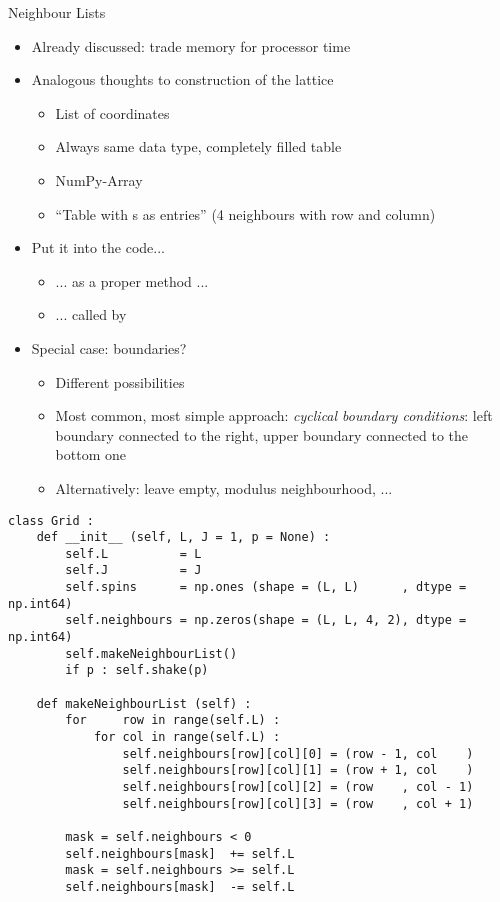 \begin{frame}[fragile]{Neighbour Lists}
%
\begin{itemize}
\item Already discussed: trade memory for processor time
\item Analogous thoughts to construction of the lattice
	\begin{itemize}
	\item List of coordinates
	\item Always same data type, completely filled table
	\item[\Thus] NumPy-Array
	\item \enquote{Table with s as entries} (4 neighbours with row and column)
	\end{itemize}
\item Put it into the code...
	\begin{itemize}
	\item ... as a proper method ...
	\item ... called by 
	\end{itemize}
\item Special case: boundaries?
	\begin{itemize}
	\item Different possibilities
	\item Most common, most simple approach: \emph{cyclical boundary conditions}: left boundary connected to the right, upper boundary connected to the bottom one
	\item Alternatively: leave empty, modulus neighbourhood, ...
	\end{itemize}
\end{itemize}
%
\end{frame}


\begin{frame}[fragile]
%
\vspace{-9pt}
\begin{codebox}
\begin{verbatim}
class Grid :
    def __init__ (self, L, J = 1, p = None) :
        self.L          = L
        self.J          = J
        self.spins      = np.ones (shape = (L, L)      , dtype = np.int64)
        self.neighbours = np.zeros(shape = (L, L, 4, 2), dtype = np.int64)
        self.makeNeighbourList()
        if p : self.shake(p)
    
    def makeNeighbourList (self) :
        for     row in range(self.L) :
            for col in range(self.L) :
                self.neighbours[row][col][0] = (row - 1, col    )
                self.neighbours[row][col][1] = (row + 1, col    )
                self.neighbours[row][col][2] = (row    , col - 1)
                self.neighbours[row][col][3] = (row    , col + 1)
                
        mask = self.neighbours < 0
        self.neighbours[mask]  += self.L
        mask = self.neighbours >= self.L
        self.neighbours[mask]  -= self.L
\end{verbatim}
\end{codebox}
%
\end{frame}

